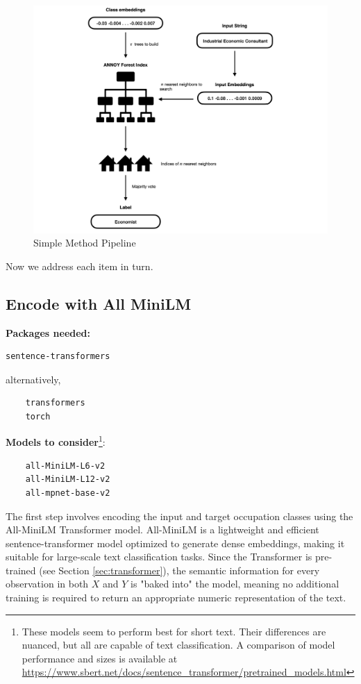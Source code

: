 \documentclass[12pt]{article}
\begin{document}
\begin{figure}
    \centering
    \includegraphics[width=0.9\linewidth]{images/pipe_black.jpeg}
    \caption{Simple Method Pipeline}
    \label{fig:pipe}
\end{figure}


Now we address each item in turn.

\subsection{Encode with All MiniLM}

\textbf{Packages needed:} \begin{verbatim}
sentence-transformers
\end{verbatim}
alternatively, 
\begin{verbatim}
    transformers
    torch
\end{verbatim}

\textbf{Models to consider}\footnote{These models seem to perform best for short text. Their differences are nuanced, but all are capable of text classification. A comparison of model performance and sizes is available at \href{https://www.sbert.net/docs/sentence_transformer/pretrained_models.html}{https://www.sbert.net/docs/sentence\_transformer/pretrained\_models.html}}:
\begin{verbatim}
    all-MiniLM-L6-v2
    all-MiniLM-L12-v2
    all-mpnet-base-v2
\end{verbatim}

The first step involves encoding the input and target occupation classes using the All-MiniLM Transformer model. All-MiniLM is a lightweight and efficient sentence-transformer model optimized to generate dense embeddings, making it suitable for large-scale text classification tasks. Since the Transformer is pre-trained (see Section \ref{sec:transformer}), the semantic information for every observation in both $X$ and $Y$ is "baked into" the model, meaning no additional training is required to return an appropriate numeric representation of the text.
\end{document}
